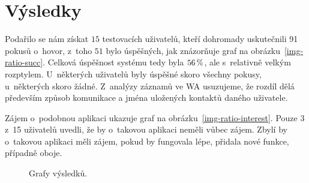 \section{Výsledky}\label{results}

Podařilo se nám získat \(15\) testovacích uživatelů, kteří dohromady uskutečnili 91
pokusů o~hovor, z~toho \(51\) bylo úspěšných, jak znázorňuje
graf na obrázku~\ref{img-ratio-succ}. Celková úspěšnost
systému tedy byla \(56\,\rm \%\), ale s~relativně velkým rozptylem. U~některých uživatelů
byly úspěšné skoro všechny pokusy, u~některých skoro žádné. Z~analýzy záznamů ve WA usuzujeme,
že rozdíl dělá především způsob komunikace a jména uložených kontaktů daného
uživatele.

Zájem o~podobnou aplikaci ukazuje graf na obrázku~\ref{img-ratio-interest}.
Pouze 3 z~15 uživatelů uvedli, že by o~takovou aplikaci neměli vůbec zájem.
Zbylí by o~takovou aplikaci měli zájem, pokud by fungovala lépe, přidala nové funkce,
případně oboje.


\newsavebox{\tempbox}
\begin{figure}[H]
    \qquad
    \caption{Grafy výsledků.}
\end{figure}

